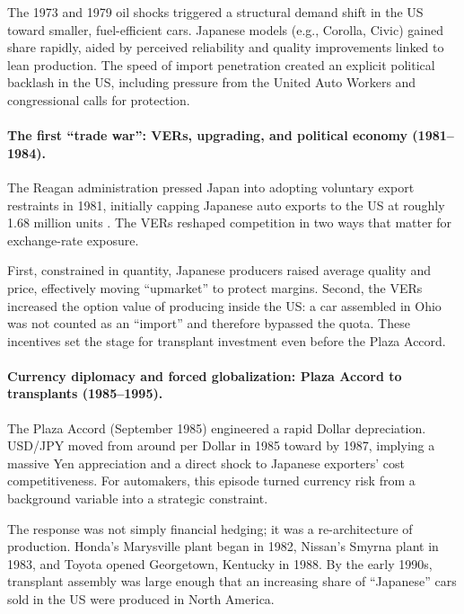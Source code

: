 \documentclass[12pt,a4paper]{article}
\begin{document}
The 1973 and 1979 oil shocks triggered a structural demand shift in the US toward smaller, fuel-efficient cars. Japanese models (e.g., Corolla, Civic) gained share rapidly, aided by perceived reliability and quality improvements linked to lean production. The speed of import penetration created an explicit political backlash in the US, including pressure from the United Auto Workers and congressional calls for protection.

\paragraph{The first ``trade war'': VERs, upgrading, and political economy (1981--1984).}

The Reagan administration pressed Japan into adopting voluntary export restraints in 1981, initially capping Japanese auto exports to the US at roughly 1.68 million units \citep{feenstra1984}. The VERs reshaped competition in two ways that matter for exchange-rate exposure.

First, constrained in quantity, Japanese producers raised average quality and price, effectively moving ``upmarket'' to protect margins. Second, the VERs increased the option value of producing inside the US: a car assembled in Ohio was not counted as an ``import'' and therefore bypassed the quota. These incentives set the stage for transplant investment even before the Plaza Accord.

\paragraph{Currency diplomacy and forced globalization: Plaza Accord to transplants (1985--1995).}

The Plaza Accord (September 1985) engineered a rapid Dollar depreciation. USD/JPY moved from around  per Dollar in 1985 toward  by 1987, implying a massive Yen appreciation and a direct shock to Japanese exporters' cost competitiveness. For automakers, this episode turned currency risk from a background variable into a strategic constraint.

The response was not simply financial hedging; it was a re-architecture of production. Honda's Marysville plant began in 1982, Nissan's Smyrna plant in 1983, and Toyota opened Georgetown, Kentucky in 1988. By the early 1990s, transplant assembly was large enough that an increasing share of ``Japanese'' cars sold in the US were produced in North America.
\end{document}
